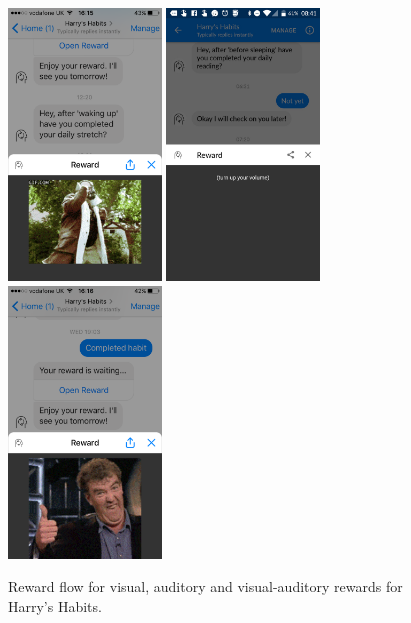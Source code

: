 \begin{figure}[H]
  \centering
  \includegraphics[width=1.6in]{resources/design/reward-visual-2.png}
  \hspace{5px}
  \includegraphics[width=1.6in]{resources/design/reward-audio.png}
  \hspace{5px}
  \includegraphics[width=1.6in]{resources/design/reward-visual-gif-2.png}
  \caption{Reward flow for visual, auditory and visual-auditory rewards for Harry's Habits.}
  \label{fig:reward_flow_screenshots}
\end{figure}

\newpage
